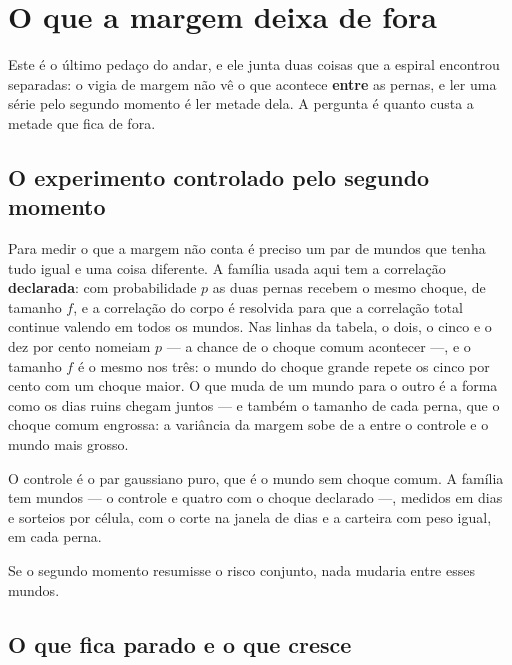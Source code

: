 \chapter{O que a margem deixa de fora}\label{cap:margem}

Este é o último pedaço do andar, e ele junta duas coisas que a espiral encontrou separadas: o vigia
de margem não vê o que acontece \textbf{entre} as pernas, e ler uma série pelo segundo momento é ler
metade dela. A pergunta é quanto custa a metade que fica de fora.

\section{O experimento controlado pelo segundo momento}

Para medir o que a margem não conta é preciso um par de mundos que tenha tudo igual e uma coisa
diferente. A família usada aqui tem a correlação \textbf{declarada}: com probabilidade $p$ as duas pernas
recebem o mesmo choque, de tamanho $f$, e a correlação do corpo é resolvida para que a correlação
total continue valendo \numMargemRho{} em todos os mundos. Nas linhas da tabela, o dois, o cinco e o dez
por cento nomeiam $p$ --- a chance de o choque comum acontecer ---, e o tamanho $f$ é o mesmo nos três:
o mundo do choque grande repete os cinco por cento com um choque maior.
O que muda de um mundo para o outro é a forma como os dias ruins chegam juntos --- e também o
tamanho de cada perna, que o choque comum engrossa: a variância da margem sobe de
\numMargemVarianciaMenor{} a \numMargemVarianciaMaior{} entre o controle e o mundo mais grosso.

O controle é o par gaussiano puro, que é o mundo sem choque comum. A família tem \numMargemMundos{} mundos --- o controle e
quatro com o choque declarado ---, medidos em \numMargemDias{} dias e
\numMargemSementes{} sorteios por célula, com o corte na janela de \numMargemJanela{} dias e a
carteira com peso igual, \numMargemPeso{} em cada perna.

Se o segundo momento resumisse o risco conjunto, nada mudaria entre esses mundos.

\section{O que fica parado e o que cresce}

